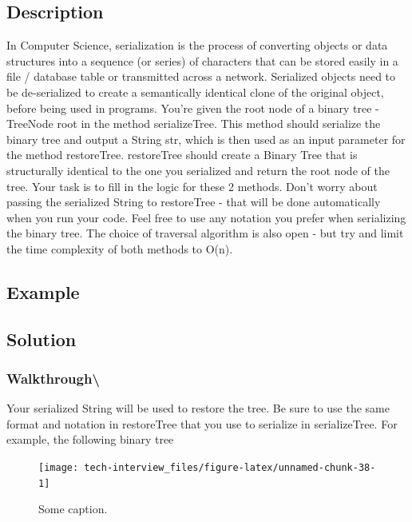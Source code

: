 \documentclass[]{book}
\begin{document}
\hypertarget{description-74}{%
\subsection{Description}\label{description-74}}

In Computer Science, serialization is the process of converting objects or data structures into a sequence (or series)
of characters that can be stored easily in a file / database table or transmitted across a network. Serialized objects
need to be de-serialized to create a semantically identical clone of the original object, before being used in programs.
You're given the root node of a binary tree - TreeNode root in the method serializeTree. This method should serialize
the binary tree and output a String str, which is then used as an input parameter for the method restoreTree.
restoreTree should create a Binary Tree that is structurally identical to the one you serialized and return the root
node of the tree. Your task is to fill in the logic for these 2 methods. Don't worry about passing the serialized String
to restoreTree - that will be done automatically when you run your code. Feel free to use any notation you prefer when
serializing the binary tree. The choice of traversal algorithm is also open - but try and limit the time complexity of
both methods to O(n).

\hypertarget{example-71}{%
\subsection{Example}\label{example-71}}

\hypertarget{solution-51}{%
\subsection{Solution}\label{solution-51}}

\hypertarget{walkthrough-85}{%
\subsubsection{Walkthrough\textbackslash{}}\label{walkthrough-85}}

Your serialized String will be used to restore the tree. Be sure to use the same format and notation in restoreTree
that you use to serialize in serializeTree. For example, the following binary tree

\begin{figure}
\texttt{[image: tech-interview\_files/figure-latex/unnamed-chunk-38-1]} \caption{Some caption.}\label{fig:unnamed-chunk-38}
\end{figure}
\end{document}
